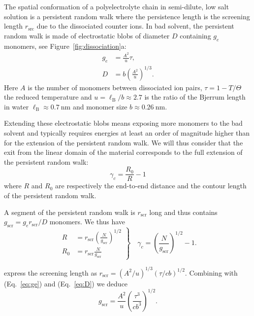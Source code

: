 \documentclass[journal=jacsat,manuscript=article]{achemso}
\begin{document}
The spatial conformation of a polyelectrolyte chain in semi-dilute, low salt solution is a persistent random walk where the persistence length is the screening length $r_\mathrm{src}$ due to the dissociated counter ions\cite{Rubinstein1996}. In bad solvent, the persistent random walk is made of electrostatic blobs of diameter $D$ containing $g_e$ monomers, see Figure~\ref{fig:dissociation}a:
\begin{align}
g_e &= \frac{A^2}{u}\tau\label{eq:ge},\\
D &= b \left(\frac{A^2}{u}\right)^{1/3}\label{eq:D}.
\end{align}
Here $A$ is the number of monomers between dissociated ion pairs, $\tau = 1 - T/\Theta$ the reduced temperature and $u = \ell_\mathrm{B}/b \approx 2.7$ is the ratio of the Bjerrum length in water $\ell_\mathrm{B}\approx \SI{0.7}{\nano\metre}$ and monomer size $b\approx \SI{0.26}{\nano\metre}$. 

Extending these electrostatic blobs means exposing more monomers to the bad solvent and typically requires energies at least an order of magnitude higher than for the extension of the persistent random walk. We will thus consider that the exit from the linear domain of the material corresponds to the full extension of the persistent random walk:
\begin{equation}
\gamma_c = \frac{R_0}{R} - 1
\end{equation}
where $R$ and $R_0$ are respectively the end-to-end distance and the contour length of the persistent random walk.

A segment of the persistent random walk is $r_\mathrm{scr}$ long and thus contains $g_\mathrm{scr} = g_e r_\mathrm{scr}/D$ monomers. We thus have
\begin{equation}
\left. \begin{array}{ll}
R &= r_\mathrm{scr} \left(\frac{N}{g_\mathrm{scr}}\right)^{1/2}\\
R_0 &= r_\mathrm{scr} \frac{N}{g_\mathrm{scr}}
\end{array}\right\rbrace\quad
\gamma_c = \left(\frac{N}{g_\mathrm{scr}}\right)^{1/2} -1\label{eq:gamma0}.
\end{equation}

\citeauthor{Rubinstein1996} express the screening length as
$r_\mathrm{scr} = \left(A^2 / u\right)^{1/3} \left(\tau /cb \right)^{1/2}$. Combining with (Eq.~\ref{eq:ge}) and (Eq.~\ref{eq:D}) we deduce
\begin{equation}
g_\mathrm{scr} = \frac{A^2}{u} \left(\frac{\tau^3}{c b^3}\right)^{1/2}\label{eq:gscr}.
\end{equation}
\end{document}
